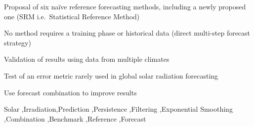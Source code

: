 \documentclass[preprint,12pt,3p]{elsarticle}
\begin{document}
\begin{frontmatter}
\begin{highlights}
\item Proposal of six na\"ive reference forecasting methods, including a newly proposed one (SRM i.e.\ Statistical Reference Method) 
\item No method requires a training phase or historical data (direct multi-step forecast strategy)
\item Validation of results using data from multiple climates
\item Test of an error metric rarely used in global solar radiation forecasting
\item Use forecast combination to improve results
\end{highlights}

\begin{keyword}
Solar \sep Irradiation\sep Prediction \sep Persistence \sep Filtering \sep Exponential Smoothing \sep Combination \sep Benchmark \sep Reference \sep Forecast


\end{keyword}

\end{frontmatter}

 \linenumbers

















 \appendix
 
\end{document}
